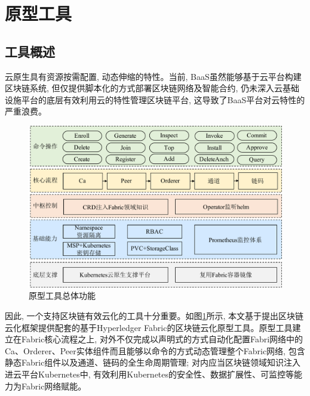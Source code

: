 \section{原型工具}

\subsection{工具概述}

云原生具有资源按需配置, 动态伸缩的特性。当前, BaaS虽然能够基于云平台构建区块链系统, 但仅提供脚本化的方式部署区块链网络及智能合约, 仍未深入云基础设施平台的底层有效利用云的特性管理区块链平台, 这导致了BaaS平台对云特性的严重浪费。

\begin{figure}[!htbp] %
    \centering %
    \includegraphics[width=1.0\textwidth]{FIGs/chapter4/tool.pdf} %
    \caption{原型工具总体功能} %
    \label{toolstotal} %
\end{figure}%

因此, 一个支持区块链有效云化的工具十分重要。如图\ref{toolstotal}所示, 本文基于提出区块链云化框架提供配套的基于Hyperledger Fabric的区块链云化原型工具。原型工具建立在Fabric核心流程之上, 对外不仅完成以声明式的方式自动化配置Fabri网络中的Ca、Orderer、Peer实体组件而且能够以命令的方式动态管理整个Fabric网络, 包含静态Fabric组件以及通道、链码的全生命周期管理; 对内应当区块链领域知识注入进云平台Kubernetes中, 有效利用Kubernetes的安全性、数据扩展性、可监控等能力为Fabric网络赋能。



